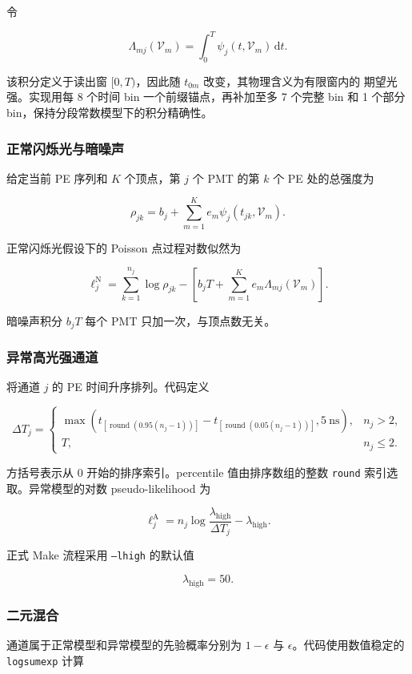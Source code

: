 \documentclass[UTF8,a4paper,11pt]{ctexart}
\begin{document}
令

\[
\Lambda_{mj}(\mathcal V_m)
=\int_0^T\psi_j(t,\mathcal V_m)\,\mathrm dt.
\]

该积分定义于读出窗 \([0,T)\)，因此随 \(t_{0m}\) 改变，其物理含义为有限窗内的
期望光强。实现用每 8 个时间 bin 一个前缀锚点，再补加至多 7 个完整 bin 和
1 个部分 bin，保持分段常数模型下的积分精确性。

\subsubsection{正常闪烁光与暗噪声}

给定当前 PE 序列和 \(K\) 个顶点，第 \(j\) 个 PMT 的第 \(k\) 个 PE 处的总强度为

\[
\rho_{jk}
=b_j+\sum_{m=1}^{K}e_m\psi_j(t_{jk},\mathcal V_m).
\]

正常闪烁光假设下的 Poisson 点过程对数似然为

\[
\ell_j^{\mathrm N}
=\sum_{k=1}^{n_j}\log\rho_{jk}
-\left[b_jT+\sum_{m=1}^{K}e_m\Lambda_{mj}(\mathcal V_m)\right].
\]

暗噪声积分 \(b_jT\) 每个 PMT 只加一次，与顶点数无关。

\subsubsection{异常高光强通道}

将通道 \(j\) 的 PE 时间升序排列。代码定义

\[
\Delta T_j=
\begin{cases}
\max\!\left(
t_{[\operatorname{round}(0.95(n_j-1))]}
-t_{[\operatorname{round}(0.05(n_j-1))]},
5\ \mathrm{ns}
\right), & n_j>2,\\[4pt]
T, & n_j\le 2.
\end{cases}
\]

方括号表示从 0 开始的排序索引。percentile 值由排序数组的整数
\texttt{round} 索引选取。异常模型的对数 pseudo-likelihood 为

\[
\ell_j^{\mathrm A}
=n_j\log\frac{\lambda_{\mathrm{high}}}{\Delta T_j}
-\lambda_{\mathrm{high}}.
\]

正式 Make 流程采用 \texttt{--lhigh} 的默认值

\[
\lambda_{\mathrm{high}}=50.
\]

\subsubsection{二元混合}

通道属于正常模型和异常模型的先验概率分别为 \(1-\epsilon\) 与 \(\epsilon\)。代码使用数值稳定的 \texttt{logsumexp} 计算
\end{document}
